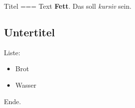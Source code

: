 \documentclass{article}
\begin{document}
Titel
===
Text \textbf{Fett}. Das soll \textit{kursiv} sein.
\subsection{Untertitel}
Liste:
\begin{itemize}
\item Brot
\item Wasser
\end{itemize}
Ende.
\end{document}
